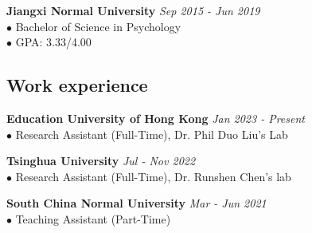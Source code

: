 \documentclass[a4paper, 10pt]{article}
\begin{document}
\bigskip

\textbf{Jiangxi Normal University} \hfill \textit{Sep 2015 - Jun 2019} \\
$\bullet$\hspace{1.8em} Bachelor of Science in Psychology \\
$\bullet$\hspace{1.8em} GPA: 3.33/4.00 \\

\bigskip

\subsection*{Work experience}

\textbf{Education University of Hong Kong} \hfill \textit{Jan 2023 - Present} \\
$\bullet$\hspace{1.8em} Research Assistant (Full-Time), Dr. Phil Duo Liu's Lab \\

\bigskip

\textbf{Tsinghua University} \hfill \textit{Jul - Nov 2022} \\
$\bullet$\hspace{1.8em} Research Assistant (Full-Time), Dr. Runshen Chen's lab \\

\bigskip

\textbf{South China Normal University} \hfill \textit{Mar - Jun 2021} \\
$\bullet$\hspace{1.8em} Teaching Assistant (Part-Time) \\

\bigskip

\end{document}
